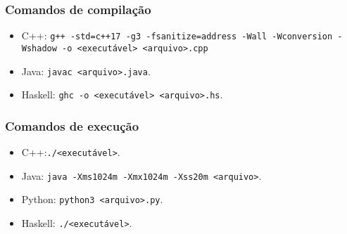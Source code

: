 \subsubsection*{Comandos de compilação}
\begin{itemize}
    \item C++: \verb|g++ -std=c++17 -g3 -fsanitize=address -Wall -Wconversion -Wshadow -o <executável> <arquivo>.cpp|
    \item Java: \verb|javac <arquivo>.java|.
    \item Haskell: \verb|ghc -o <executável> <arquivo>.hs|.
\end{itemize}

\subsubsection*{Comandos de execução}
\begin{itemize}
    \item C++:\verb|./<executável>|.
    \item Java: \verb|java -Xms1024m -Xmx1024m -Xss20m <arquivo>|.
    \item Python: \verb|python3 <arquivo>.py|.
    \item Haskell: \verb|./<executável>|.
\end{itemize}